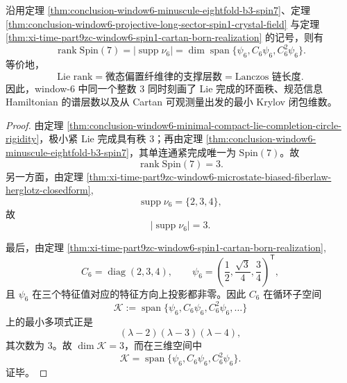 \begin{theorem}\label{thm:xi-time-part9zd-window6-lie-support-krylov-rank-coincidence}
沿用定理 \ref{thm:conclusion-window6-minuscule-eightfold-b3-spin7}、定理 \ref{thm:conclusion-window6-projective-long-sector-spin1-crystal-field} 与定理 \ref{thm:xi-time-part9zc-window6-spin1-cartan-born-realization} 的记号，则有
\[
\operatorname{rank}\mathrm{Spin}(7)
=
\left|\operatorname{supp}\nu_6\right|
=
\dim \operatorname{span}\{\psi_6,C_6\psi_6,C_6^2\psi_6\}.
\]
等价地，
\[
\text{Lie rank}
=
\text{微态偏置纤维律的支撑层数}
=
\text{Lanczos 链长度}.
\]
因此，window-\(6\) 中同一个整数 \(3\) 同时刻画了 Lie 完成的环面秩、规范信息 Hamiltonian 的谱层数以及从 Cartan 可观测量出发的最小 Krylov 闭包维数。
\end{theorem}
\begin{proof}
由定理 \ref{thm:conclusion-window6-minimal-compact-lie-completion-circle-rigidity}，极小紧 Lie 完成具有秩 \(3\)；再由定理 \ref{thm:conclusion-window6-minuscule-eightfold-b3-spin7}，其单连通紧完成唯一为 \(\mathrm{Spin}(7)\)。故
\[
\operatorname{rank}\mathrm{Spin}(7)=3.
\]
另一方面，由定理 \ref{thm:xi-time-part9zc-window6-microstate-biased-fiberlaw-herglotz-closedform},
\[
\operatorname{supp}\nu_6=\{2,3,4\},
\]
故
\[
\left|\operatorname{supp}\nu_6\right|=3.
\]

最后，由定理 \ref{thm:xi-time-part9zc-window6-spin1-cartan-born-realization},
\[
C_6=\operatorname{diag}(2,3,4),
\qquad
\psi_6=\left(\frac12,\frac{\sqrt3}{4},\frac34\right)^{\mathsf T},
\]
且 \(\psi_6\) 在三个特征值对应的特征方向上投影都非零。因此 \(C_6\) 在循环子空间
\[
\mathcal K:=\operatorname{span}\{\psi_6,C_6\psi_6,C_6^2\psi_6,\dots\}
\]
上的最小多项式正是
\[
(\lambda-2)(\lambda-3)(\lambda-4),
\]
其次数为 \(3\)。故 \(\dim\mathcal K=3\)，而在三维空间中
\[
\mathcal K=\operatorname{span}\{\psi_6,C_6\psi_6,C_6^2\psi_6\}.
\]
证毕。
\end{proof}

